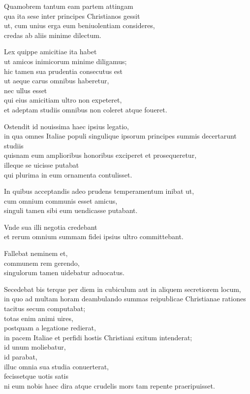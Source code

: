 \documentclass[a5paper,twoside]{article}
\begin{document}
Quamobrem tantum eam partem attingam \\
qua ita sese inter principes Christianos gessit \\
ut, cum unius erga eum beniuolentiam consideres, \\
credas ab aliis minime dilectum. 

Lex quippe amicitiae ita habet \\
ut amicos inimicorum minime diligamus; \\
hic tamen sua prudentia consecutus est \\
ut aeque carus omnibus haberetur, \\
nec ullus esset \\
qui eius amicitiam ultro non expeteret, \\
et adeptam studiis omnibus non coleret atque foueret. 

Ostendit id nouissima haec ipsius legatio, \\
in qua omnes Italiae populi singulique ipsorum principes summis decertarunt studiis \\
quisnam eum amplioribus honoribus exciperet et prosequeretur, \\
illeque se uicisse putabat \\
qui plurima in eum ornamenta contulisset. 

In quibus acceptandis adeo prudens temperamentum inibat ut, \\
cum omnium communis esset amicus, \\
singuli tamen sibi eum uendicasse putabant. 

Vnde sua illi negotia credebant \\
et rerum omnium summam fidei ipsius ultro committebant. 

Fallebat neminem et, \\
communem rem gerendo, \\
singulorum tamen uidebatur aduocatus. 

Secedebat bis terque per diem in cubiculum aut in aliquem secretiorem locum, \\
in quo ad multam horam deambulando summas reipublicae Christianae rationes tacitus secum computabat; \\
totas enim animi uires, \\
postquam a legatione redierat, \\
in pacem Italiae et perfidi hostis Christiani exitum intenderat; \\
id unum moliebatur, \\
id parabat, \\
illuc omnia sua studia conuerterat, \\
fecissetque uotis satis \\
ni eum nobis haec dira atque crudelis mors tam repente praeripuisset. 
\end{document}
